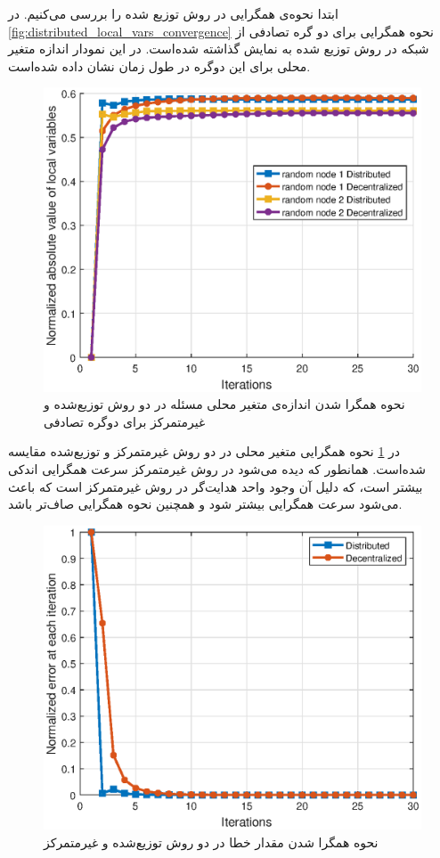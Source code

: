 	ابتدا نحوه‌ی همگرایی در روش توزیع شده را بررسی می‌کنیم. در \cref{fig:distributed_local_vars_convergence} نحوه همگرایی برای دو گره تصادفی از شبکه در روش توزیع شده به نمایش گذاشته شده‌است. در این نمودار اندازه متغیر محلی برای این دوگره در طول زمان نشان داده شده‌است. 
	
\begin{figure}[h!]
	\centerline{\includegraphics[width=12cm]{graphics/4-heuristic-dist/distributed_decent_local_vars_convergence}}
	\caption{نحوه‌ همگرا شدن اندازه‌ی متغیر  محلی مسئله در دو روش توزیع‌شده و غیرمتمرکز برای دوگره تصادفی}
	\label{fig:distributed_decent_local_vars_convergence}
\end{figure}

	در \cref{fig:distributed_decent_local_vars_convergence}	نحوه‌ همگرایی متغیر محلی در دو روش غیرمتمرکز و توزیع‌شده مقایسه شده‌است. همانطور که دیده می‌شود در روش غیرمتمرکز سرعت همگرایی اندکی بیشتر است، که دلیل آن وجود واحد هدایت‌گر در روش غیرمتمرکز است که باعث می‌شود سرعت همگرایی بیشتر شود و همچنین نحوه همگرایی صاف‌تر باشد. 

\begin{figure}[h!]
	\centerline{\includegraphics[width=12cm]{graphics/4-heuristic-dist/error_convergence_dist_decent}}
	\caption{نحوه همگرا شدن مقدار خطا در دو روش توزیع‌شده و غیرمتمرکز}
	\label{fig:error_convergence_dist_decent}
\end{figure}

